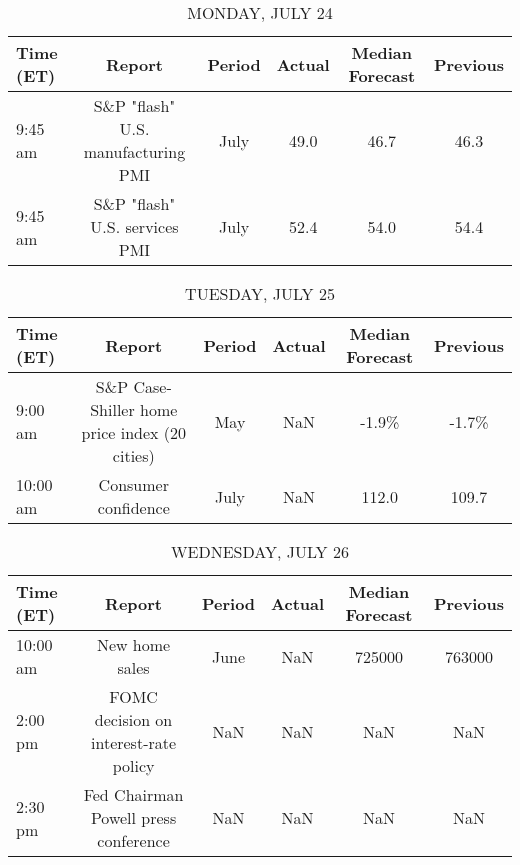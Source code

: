 \documentclass{article}%
\begin{document}
%
\normalsize%


\begin{table}[htbp]%
\caption{MONDAY, JULY 24}%
\centering%
\begin{adjustbox}{width=1\textwidth}%
\begin{tabular}{lccccc}
\toprule
Time (ET) &                             Report & Period & Actual & Median Forecast & Previous \\
\midrule
  9:45 am & S\&P "flash" U.S. manufacturing PMI &   July &   49.0 &            46.7 &     46.3 \\
  9:45 am &      S\&P "flash" U.S. services PMI &   July &   52.4 &            54.0 &     54.4 \\
\bottomrule
\end{tabular}
%
\end{adjustbox}%
\end{table}

%


\begin{table}[htbp]%
\caption{TUESDAY, JULY 25}%
\centering%
\begin{adjustbox}{width=1\textwidth}%
\begin{tabular}{lccccc}
\toprule
Time (ET) &                                        Report & Period & Actual & Median Forecast & Previous \\
\midrule
  9:00 am & S\&P Case-Shiller home price index (20 cities) &    May &    NaN &           -1.9\% &    -1.7\% \\
 10:00 am &                           Consumer confidence &   July &    NaN &           112.0 &    109.7 \\
\bottomrule
\end{tabular}
%
\end{adjustbox}%
\end{table}

%


\begin{table}[htbp]%
\caption{WEDNESDAY, JULY 26}%
\centering%
\begin{adjustbox}{width=1\textwidth}%
\begin{tabular}{lccccc}
\toprule
Time (ET) &                                Report & Period & Actual & Median Forecast & Previous \\
\midrule
 10:00 am &                        New home sales &   June &    NaN &          725000 &   763000 \\
  2:00 pm & FOMC decision on interest-rate policy &    NaN &    NaN &             NaN &      NaN \\
  2:30 pm &  Fed Chairman Powell press conference &    NaN &    NaN &             NaN &      NaN \\
\bottomrule
\end{tabular}
%
\end{adjustbox}%
\end{table}
\end{document}
